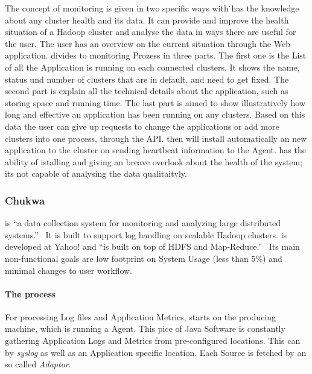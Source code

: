 The concept of monitoring is given in two specific ways with \amb\. \amb has the knowledge about any cluster health and its data. It can provide and improve the health situation of a Hadoop cluster and analyse the data in ways there are useful for the user. The user has an overview on the current situation through the Web application. \amb divides to monitoring Prozess in three parts. The first one is the List of all the Application \amb is running on each connected clusters. It shows the name, status und number of clusters that are in default, and need to get fixed. The second part is explain all the technical details about the application, such as storing space and running time. The last part is aimed to show illustratively how long and effective an application has been running on any clusters. Based on this data the user can give up requests to change the applications or add more clusters into one process, through the API. \amb then will install automatically an new application to the cluster on sending heartbeat information to the \amb Agent. \amb has the ability of istalling and giving an breave overlook about the health of the system; its not capable of analysing the data qualitaitvly.

\subsubsection{Chukwa}
\chuklong is ``a data collection system for monitoring and analyzing large distributed systems.''~\cite{Boulona}
It is built to support log handling on scalable Hadoop clusters. \chuk is developed at Yahoo! and ``is built on top of HDFS and Map-Reduce.''~\cite{Rabkin2008a}
Its main non-functional goals are low footprint on System Usage (less than 5\%) and minimal changes to user workflow.~\cite{Rabkin2010}

\paragraph{The process}
For processing Log files and Application Metrics, \chuk starts on the producing machine, which is running a \chuk Agent. 
This pice of Java Software is constantly gathering Application Logs and Metrics from pre-configured locations. 
This can by \textit{syslog} as well as an Application specific location. 
Each Source is fetched by an so called \textit{Adaptor}.~\cite{ChukwaAdminAgent}

